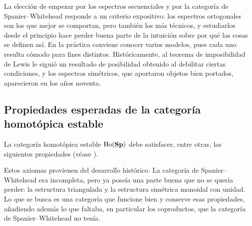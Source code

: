 La elección de empezar por los espectros secuenciales y por la categoría de Spanier--Whitehead responde a un criterio expositivo: los espectros ortogonales son los que mejor se comportan, pero también los más técnicos, y estudiarlos desde el principio hace perder buena parte de la intuición sobre por qué las cosas se definen así. En la práctica conviene conocer varios modelos, pues cada uno resulta cómodo para fines distintos. Históricamente, al teorema de imposibilidad de Lewis le siguió un resultado de posibilidad obtenido al debilitar ciertas condiciones, y los espectros simétricos, que aportaron objetos bien portados, aparecieron en los años noventa.

\subsection{Propiedades esperadas de la categoría homotópica estable}

La categoría homotópica estable \(\operatorname{Ho}(\mathbf{Sp})\) debe satisfacer, entre otras, las siguientes propiedades (véase \cite{margolis1983}).

Estos axiomas provienen del desarrollo histórico. La categoría de Spanier--Whitehead era incompleta, pero ya poseía una parte buena que no se quería perder: la estructura triangulada y la estructura simétrica monoidal con unidad. Lo que se busca es una categoría que funcione bien y conserve esas propiedades, añadiendo además lo que faltaba, en particular los coproductos, que la categoría de Spanier--Whitehead no tenía.

